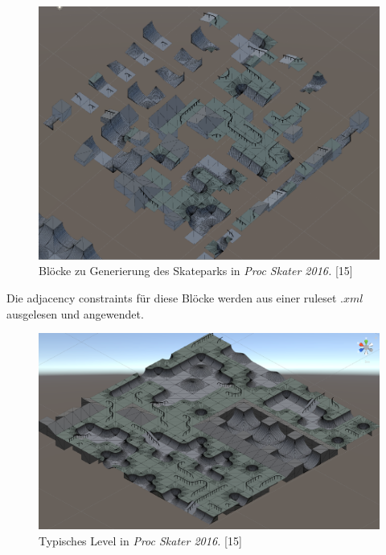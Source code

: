\documentclass[12pt, a4paper,twoside,openright]{report}
\begin{document}
\begin{figure}[H]
    \centering
    \includegraphics[width=1\linewidth]{images/proc-skater-ruleset.png}%
    \caption{Blöcke zu Generierung des Skateparks in \textit{Proc Skater 2016.} {[15]}}%
\end{figure}

Die adjacency constraints für diese Blöcke werden aus einer ruleset $.xml$ ausgelesen und angewendet.

\begin{figure}[H]
    \centering
    \includegraphics[width=1\linewidth]{images/proc-skate-level.png}%
    \caption{Typisches Level in \textit{Proc Skater 2016.} {[15]}}%
\end{figure}
\end{document}
